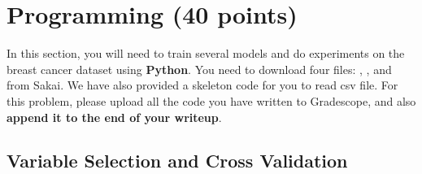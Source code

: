 \documentclass[11pt]{article}
\begin{document}
\section{Programming (40 points)}
In this section, you will need to train several models and do experiments on the breast cancer dataset using \textbf{Python}. You need to download four files: , ,  and  from Sakai. We have also provided a skeleton code for you to read csv file. For this problem, please upload all the code you have written to Gradescope, and also \textbf{append it to the end of your writeup}.

\subsection{Variable Selection and Cross Validation}\label{sec:cv}
\end{document}
